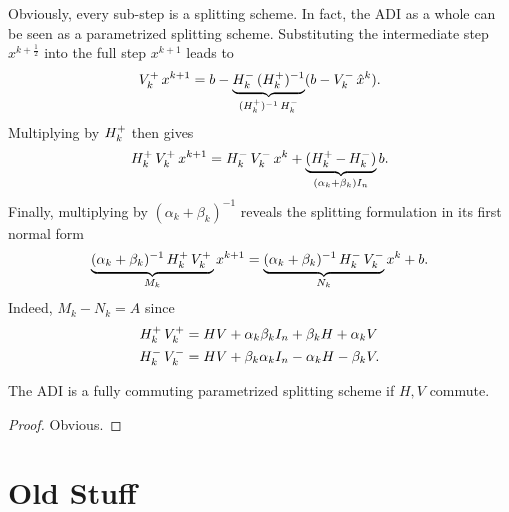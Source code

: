 Obviously, every sub-step is a splitting scheme.
In fact, the ADI as a whole can be seen as a parametrized splitting scheme.
Substituting the intermediate step $x^{k+\frac{1}{2}}$ into the full step $x^{k+1}$ leads to
\begin{equation}
  \mathop{V_k^+} x^{k+1}
  = b - \underbrace{
    \mathop{H_k^-}\mathop{(\mathop{H_k^+})^{-1}}
  }_{\mathop{(\mathop{H_k^+})^{-1}}\mathop{H_k^-}}
  (b - \mathop{V_k^-} \hat x^k)
  .
\end{equation}
Multiplying by $\mathop{H_k^+}$ then gives
\begin{equation}
  \Aip\Aiip x^{k+1} = \Aim\Aiim x^k +
  \underbrace{%
  (\Aip - \Aim)
  }_{(\alpha_k + \beta_k) I_n}
  b
  .
\end{equation}
Finally, multiplying by $(\alpha_k + \beta_k)^{-1}$ reveals the splitting formulation in its first normal form
\begin{equation}
\label{eq:adi:general1step}
  \underbrace{
    (\alpha_k + \beta_k)^{-1} \mathop{H_k^+}\mathop{V_k^+} \\
  }_{M_k}
  x^{k+1} =
  \underbrace{
    (\alpha_k + \beta_k)^{-1} \mathop{H_k^-}\mathop{V_k^-}
  }_{N_k}
  x^k + b
  .
\end{equation}
Indeed, $M_k - N_k = A$ since
\begin{equation}
\begin{aligned}
  \mathop{H_k^+}\mathop{V_k^+} &= HV + \alpha_k\beta_k I_n + \beta_k H + \alpha_k V \\
  \mathop{H_k^-}\mathop{V_k^-} &= HV + \beta_k\alpha_k I_n - \alpha_k H - \beta_k V
  .
\end{aligned}
\end{equation}

\begin{corollary}
  The ADI is a fully commuting parametrized splitting scheme if $H,V$ commute.
\end{corollary}
\begin{proof}
  Obvious.
\end{proof}

\section{Old Stuff}

